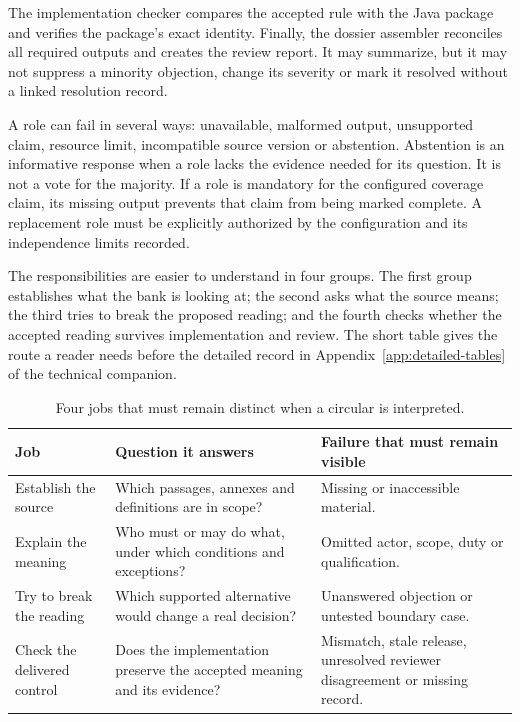 \documentclass[12pt,a4paper,oneside,openany]{book}
\begin{document}
The implementation checker compares the accepted rule with the Java package and
verifies the package's exact identity. Finally, the dossier assembler reconciles
all required outputs and creates the review report. It may summarize, but it may
not suppress a minority objection, change its severity or mark it resolved without
a linked resolution record.

A role can fail in several ways: unavailable, malformed output, unsupported
claim, resource limit, incompatible source version or abstention. Abstention is
an informative response when a role lacks the evidence needed for its question.
It is not a vote for the majority. If a role is mandatory for the configured
coverage claim, its missing output prevents that claim from being marked complete.
A replacement role must be explicitly authorized by the configuration and its
independence limits recorded.

The responsibilities are easier to understand in four groups. The first group
establishes what the bank is looking at; the second asks what the source means;
the third tries to break the proposed reading; and the fourth checks whether the
accepted reading survives implementation and review. The short table gives the
route a reader needs before the detailed record in Appendix~\ref{app:detailed-tables} of the technical companion.

\begin{table}[H]
\centering
\caption{Four jobs that must remain distinct when a circular is interpreted.}
\label{tab:ensemble-roles}
\begin{tabularx}{\textwidth}{P{35mm}YY}
\toprule
Job & Question it answers & Failure that must remain visible\\
\midrule
Establish the source & Which passages, annexes and definitions are in scope? & Missing or inaccessible material.\\
\addlinespace[0.5em]
Explain the meaning & Who must or may do what, under which conditions and exceptions? & Omitted actor, scope, duty or qualification.\\
\addlinespace[0.5em]
Try to break the reading & Which supported alternative would change a real decision? & Unanswered objection or untested boundary case.\\
\addlinespace[0.5em]
Check the delivered control & Does the implementation preserve the accepted meaning and its evidence? & Mismatch, stale release, unresolved reviewer disagreement or missing record.\\
\bottomrule
\end{tabularx}
\end{table}
\end{document}
